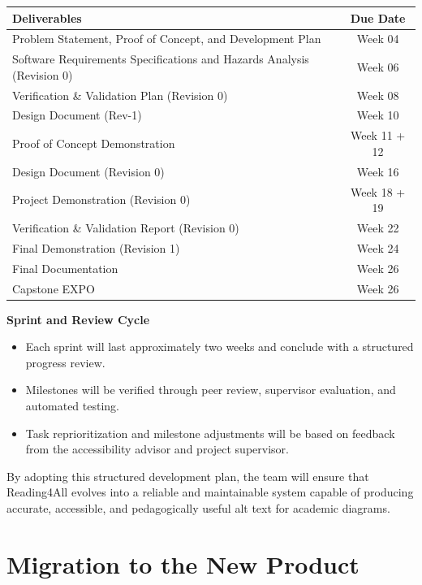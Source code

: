 \documentclass[12pt]{article}
\begin{document}
\begin{center}
  \begin{tabularx}{\textwidth}{Xc}
    \toprule
    \textbf{Deliverables} & \textbf{Due Date} \\
    \midrule
    Problem Statement, Proof of Concept, and Development Plan & Week  04 \\
    Software Requirements Specifications and Hazards Analysis (Revision 0) & Week 06 \\
    Verification \& Validation Plan (Revision 0) & Week 08 \\
    Design Document (Rev-1) & Week 10 \\
    Proof of Concept Demonstration & Week 11 + 12 \\
    Design Document (Revision 0) & Week 16 \\
    Project Demonstration (Revision 0) & Week 18 + 19 \\
    Verification \& Validation Report (Revision 0) & Week 22 \\
    Final Demonstration (Revision 1) & Week 24 \\
    Final Documentation & Week 26 \\
    Capstone EXPO & Week 26 \\
    \bottomrule
  \end{tabularx}
\end{center}

\textbf{Sprint and Review Cycle}

\begin{itemize}
    \item Each sprint will last approximately two weeks and conclude with a structured progress review.  
    \item Milestones will be verified through peer review, supervisor evaluation, and automated testing.  
    \item Task reprioritization and milestone adjustments will be based on feedback from the accessibility advisor and project supervisor.  
\end{itemize}

\noindent By adopting this structured development plan, the team will ensure
that Reading4All evolves into a reliable and maintainable system
capable of producing accurate, accessible, and pedagogically useful
alt text for academic diagrams.

\section{Migration to the New Product}
\end{document}
